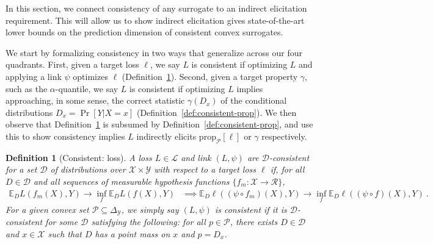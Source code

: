 \documentclass[11pt]{article} %
\newcommand{\Comments}{1}
\newcommand{\mynote}[2]{\ifnum\Comments=1\textcolor{#1}{#2}\fi}
\newcommand{\mytodo}[2]{\ifnum\Comments=1%
	\todo[linecolor=#1!80!black,backgroundcolor=#1,bordercolor=#1!80!black]{#2}\fi}
\newcommand{\raft}[1]{\mytodo{green!20!white}{RF: #1}}
\newcommand{\jessie}[1]{\mynote{purple}{[JF: #1]}}
\newcommand{\simplex}{\Delta_\Y}
\newcommand{\prop}[2][\mathcal{P}]{\mathrm{prop}_{#1}[#2]}
\newcommand{\D}{\mathcal{D}}
\newcommand{\E}{\mathbb{E}}
\renewcommand{\L}{\mathcal{L}}
\newcommand{\R}{\mathcal{R}}
\renewcommand{\P}{\mathcal{P}}
\newcommand{\X}{\mathcal{X}}
\newcommand{\Y}{\mathcal{Y}}
\newtheorem{definition}{Definition}
\begin{document}
In this section, we connect consistency of any surrogate to an indirect elicitation requirement.
This will allow us to show indirect elicitation gives state-of-the-art lower bounds on the prediction dimension of consistent convex surrogates.

We start by formalizing consistency in two ways that generalize across our four quadrants.
First, given a target loss $\ell$, we say $L$ is consistent if optimizing $L$ and applying a link $\psi$ optimizes $\ell$ (Definition~\ref{def:consistent-ell}).
Second, given a target property $\gamma$, such as the $\alpha$-quantile, we say $L$ is consistent if optimizing $L$ implies approaching, in some sense, the correct statistic $\gamma(D_x)$ of the conditional distributions $D_x = \Pr[Y|X=x]$ (Definition~\ref{def:consistent-prop}).
We then observe that Definition~\ref{def:consistent-ell} is subsumed by Definition~\ref{def:consistent-prop}, and use this to show consistency implies $L$ indirectly elicits $\prop{\ell}$ or $\gamma$ respectively.

\begin{definition}[Consistent: loss]\label{def:consistent-ell}
	A loss $L \in \L$ and link $(L,\psi)$ are \emph{$\D$-consistent} for a set $\D$ of distributions over $\X \times \Y$ with respect to a target loss $\ell$ if, for all $D \in \D$ and all sequences of measurable hypothesis functions $\{f_m : \X \to \R\}$,
	\begin{align*}
	\E_D L(f_m(X), Y) \to \inf_f \E_D L(f(X), Y) &\implies \E_D \ell((\psi \circ f_m)(X), Y) \to \inf_f \E_D \ell((\psi \circ f)(X), Y)~.~
	\end{align*}
	For a given convex set $\P \subseteq \simplex$, we simply say $(L,\psi)$ is \emph{consistent} if it is $\D$-consistent for some $\D$ satisfying the following: for all $p \in \P$, there exists $D \in \D$ and $x \in \X$ such that $D$ has a point mass on $x$ and $p = D_x$.
\end{definition}
\end{document}
